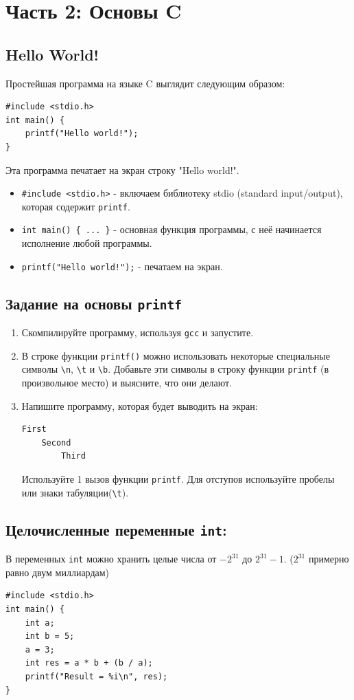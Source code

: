 \documentclass{article}
\begin{document}
\newpage
\section*{Часть 2: Основы C}
\subsection*{Hello World!}
Простейшая программа на языке C выглядит следующим образом:
\begin{lstlisting}
#include <stdio.h>
int main() {
    printf("Hello world!");
}
\end{lstlisting}

Эта программа печатает на экран строку "Hello world!".
\begin{itemize}
\item \texttt{\#include <stdio.h>}  - включаем библиотеку stdio (standard input/output), которая содержит \texttt{printf}.
\item \texttt{int main() \{ ... \}} - основная функция программы, с неё начинается исполнение любой программы.
\item \texttt{printf("Hello world!");} - печатаем на экран.
\end{itemize}

\subsection*{Задание на основы \texttt{printf}}
\begin{enumerate}
\item Скомпилируйте программу, используя \texttt{gcc} и запустите.
\item В строке функции \texttt{printf()} можно использовать некоторые специальные символы \texttt{\textbackslash n}, \texttt{\textbackslash t} и \texttt{\textbackslash b}. Добавьте эти символы в строку функции \texttt{printf} (в произвольное место) и выясните, что они делают.
\item Напишите программу, которая будет выводить на экран:
\begin{verbatim}
First
    Second
        Third
\end{verbatim}
Используйте 1 вызов функции \texttt{printf}. Для отступов используйте пробелы или знаки табуляции(\texttt{\textbackslash t}).
\end{enumerate}

\subsection*{Целочисленные переменные \texttt{int}:}
В переменных \texttt{int} можно хранить целые числа от $-2^{31}$ до $2^{31} - 1$. ($2^{31}$ примерно равно двум миллиардам)
\begin{lstlisting}
#include <stdio.h>
int main() {
    int a;
    int b = 5;
    a = 3;
    int res = a * b + (b / a);
    printf("Result = %i\n", res);
}
\end{lstlisting}
\end{document}

